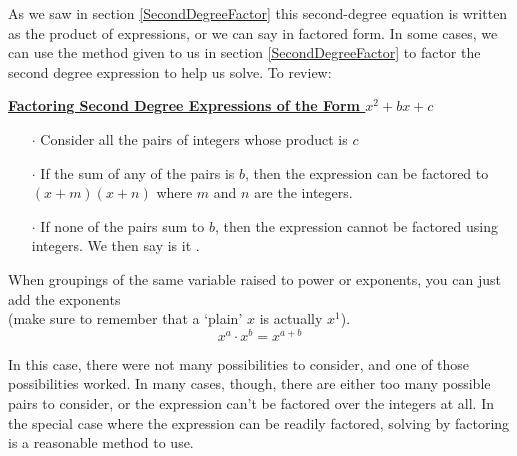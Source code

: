 As we saw in section \ref{SecondDegreeFactor} this second-degree equation is written as the product of expressions, or we can say in factored form.  In some cases, we can use the method given to us in section \ref{SecondDegreeFactor} to factor the second degree expression to help us solve. To review:

%
%

\begin{definition}
	\textbf{\underline{Factoring Second Degree Expressions of the Form $x^2+bx+c$}}\\
	\bigskip
	\begin{enumerate}
		\item[$\cdot$] Consider all the pairs of integers whose product is $c$
		\item[$\cdot$] If the sum of any of the pairs is $b$, then the expression can be factored to $(x+m)(x+n)$ where $m$ and $n$ are the integers.
		\item[$\cdot$] If none of the pairs sum to $b$, then the expression cannot be factored using integers. We then say is it .
	\end{enumerate}

	When groupings of the same variable raised to power or exponents, you can just add the exponents\\ (make sure to remember that a ‘plain’ $x$ is actually $x^1$).
	$$x^a \cdot x^b = x^{a+b}$$
\end{definition}



In this case, there were not many possibilities to consider, and one of those possibilities worked. In many cases, though, there are either too many possible pairs to consider, or the expression can’t be factored over the integers at all.  In the special case where the expression can be readily factored, solving by factoring is a reasonable method to use.

